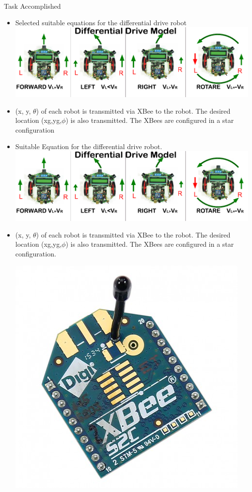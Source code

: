 \documentclass[11pt, a4paper]{beamer}
\begin{document}
\begin{frame}{Task Accomplished}
\begin{itemize}

		\item Selected suitable equations for the differential drive robot\\
		\includegraphics[scale =.4]{images/ddrive.jpg}
		\item (x, y, $\theta$) of each robot is transmitted via XBee to the robot. The desired location (xg,yg,$\phi$) is also transmitted. The XBees are configured in a star configuration
		\item Suitable Equation for the differential drive robot. \\
		\includegraphics[scale =.40]{images/ddrive.jpg}
		\item (x, y, $\theta$) of each robot is transmitted via XBee to the robot. The desired location (xg,yg,$\phi$) is also transmitted. The XBees are configured in a star configuration. 
		\\ \begin{center}
			\includegraphics[scale =.12]{images/xbee.jpg}

\end{center}
\end{itemize}
\end{frame}
\end{document}
